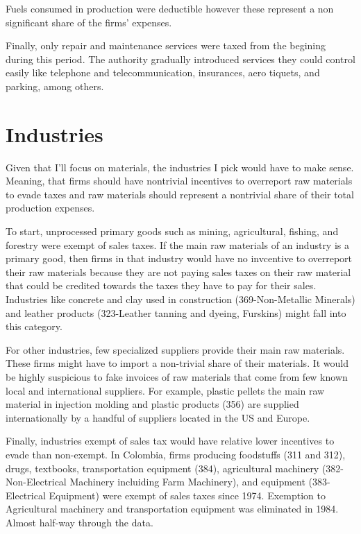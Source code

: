 \documentclass[
  12pt]{article}
\theoremstyle{definition}
\theoremstyle{remark}
\begin{document}
Fuels consumed in production were deductible however these represent a
non significant share of the firms' expenses.

Finally, only repair and maintenance services were taxed from the
begining during this period. The authority gradually introduced services
they could control easily like telephone and telecommunication,
insurances, aero tiquets, and parking, among others.

\section{Industries}\label{industries}

Given that I'll focus on materials, the industries I pick would have to
make sense. Meaning, that firms should have nontrivial incentives to
overreport raw materials to evade taxes and raw materials should
represent a nontrivial share of their total production expenses.

To start, unprocessed primary goods such as mining, agricultural,
fishing, and forestry were exempt of sales taxes. If the main raw
materials of an industry is a primary good, then firms in that industry
would have no invcentive to overreport their raw materials because they
are not paying sales taxes on their raw material that could be credited
towards the taxes they have to pay for their sales. Industries like
concrete and clay used in construction (369-Non-Metallic Minerals) and
leather products (323-Leather tanning and dyeing, Furskins) might fall
into this category.

For other industries, few specialized suppliers provide their main raw
materials. These firms might have to import a non-trivial share of their
materials. It would be highly suspicious to fake invoices of raw
materials that come from few known local and international suppliers.
For example, plastic pellets the main raw material in injection molding
and plastic products (356) are supplied internationally by a handful of
suppliers located in the US and Europe.

Finally, industries exempt of sales tax would have relative lower
incentives to evade than non-exempt. In Colombia, firms producing
foodstuffs (311 and 312), drugs, textbooks, transportation equipment
(384), agricultural machinery (382-Non-Electrical Machinery incluiding
Farm Machinery), and equipment (383-Electrical Equipment) were exempt of
sales taxes since 1974. Exemption to Agricultural machinery and
transportation equipment was eliminated in 1984. Almost half-way through
the data.
\end{document}
